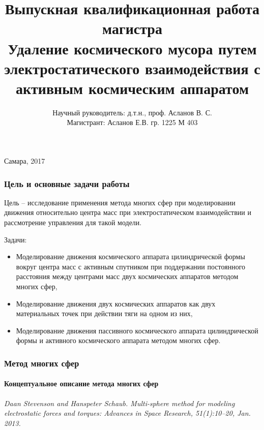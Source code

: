 \documentclass[10pt,pdf,hyperref={unicode}]{beamer}
\title[Удаление космического мусора путем электростатического взаимодействия с активным КА]{Выпускная квалификационная работа магистра\\
Удаление космического мусора путем электростатического взаимодействия с активным космическим аппаратом}
\author[Асланов Е.В.]{Научный руководитель: д.т.н., проф. Асланов В. С.\\
Магистрант: Асланов Е.В. гр. 1225 М 403}
\date[]{}
\begin{document}
\begin{frame}
	\titlepage
	\begin{center}
		Самара, 2017
	\end{center}
\end{frame} 

\begin{frame}
\frametitle{Цель и основные задачи работы}
		Цель – исследование применения метода многих сфер при моделировании движения относительно центра масс при электростатическом взаимодействии и рассмотрение управления для такой модели.
		
		Задачи:
		\begin{itemize}
				\item Моделирование движения космического аппарата цилиндрической формы вокруг центра масс с активным спутником при поддержании постоянного расстояния между центрами масс двух космических аппаратов методом многих сфер,
				\item Моделирование движения двух космических аппаратов как двух материальных точек при действии тяги на одном из них,
				\item Моделирование движения пассивного космического аппарата цилиндрической формы и активного космического аппарата методом многих сфер.
		\end{itemize}
\end{frame}

\begin{frame}
\frametitle{Метод  многих сфер}
\framesubtitle{Концептуальное описание метода многих сфер}
	\begin{figure}[H]
	\end{figure}
	\footnotesize{\textit{Daan Stevenson and Hanspeter Schaub. Multi-sphere method for modeling electrostatic forces and torques: Advances in Space Research, 51(1):10–20, Jan. 2013.}}
\end{frame}
\end{document}
